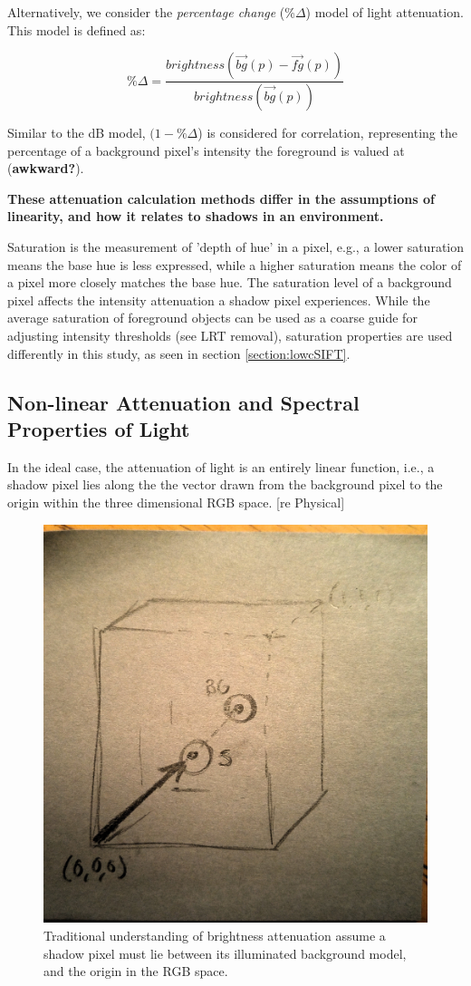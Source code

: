 \documentclass[12pt]{report}
\begin{document}
Alternatively, we consider the \textit{percentage change} (\%$\Delta$) model of light attenuation. This model is defined as:

\begin{equation}
\%\Delta = \dfrac{brightness(\vec{bg}(p) - \vec{fg}(p))}{brightness(\vec{bg}(p))}
\end{equation}

Similar to the dB model, $(1 - \%\Delta$) is considered for correlation, representing the percentage of a background pixel's intensity the foreground is valued at (\textbf{awkward?}).

\textbf{These attenuation calculation methods differ in the assumptions of linearity, and how it relates to shadows in an environment.}

Saturation is the measurement of 'depth of hue' in a pixel, e.g., a lower saturation means the base hue is less expressed, while a higher saturation means the color of a pixel more closely matches the base hue. The saturation level of a background pixel affects the intensity attenuation a shadow pixel experiences. While the average saturation of foreground objects can be used as a coarse guide for adjusting intensity thresholds (see LRT removal), saturation properties are used differently in this study, as seen in section \ref{section:lowcSIFT}.

\subsection{Non-linear Attenuation and Spectral Properties of Light} \label{section:nonlinearatten}

In the ideal case, the attenuation of light is an entirely linear function, i.e., a shadow pixel lies along the the vector drawn from the background pixel to the origin within the three dimensional RGB space. [re Physical]

\begin{figure}
  \centering
  \includegraphics[width=.5\linewidth]{figures/mockup_rgbcube.jpg}
  \caption{Traditional understanding of brightness attenuation assume a shadow pixel must lie between its illuminated background model, and the origin in the RGB space.}
  \label{fig:rgbcube}
\end{figure}
\end{document}
